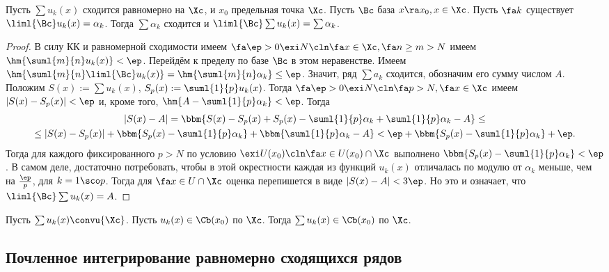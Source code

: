 \documentclass[a4paper]{article}
\begin{document}
\begin{theorem}
Пусть $\sum u_k(x)$ сходится равномерно на $\Xc$, и $x_0$ предельная точка $\Xc$. Пусть $\Bc$ база
$x \ra x_0, x \in \Xc$. Пусть $\fa k$ существует $\liml{\Bc} u_k(x) =\alpha_k$. Тогда $\sum \alpha_k$ сходится и $\liml{\Bc}
\sum u_k(x) = \sum \alpha_k$.
\end{theorem}
\begin{proof}
В силу КК и равномерной сходимости имеем $\fa \ep > 0 \exi N\cln \fa x \in \Xc, \fa n \ge m>N$ имеем $\hm{\suml{m}{n}u_k(x)} < \ep$.
Перейдём к пределу по базе $\Bc$ в этом неравенстве. Имеем $\hm{\suml{m}{n}\liml{\Bc}u_k(x)} = \hm{\suml{m}{n} \alpha_k}
\le \ep$. Значит, ряд $\sum a_k$ сходится, обозначим его сумму числом $A$. Положим $S(x) := \sum u_k(x)$, $S_p(x) := \suml{1}{p} u_k(x)$.
Тогда $\fa \ep > 0 \exi N\cln \fa p > N, \fa x \in \Xc$ имеем $|S(x)-S_p(x)|<\ep$ и, кроме того, $\hm{A-\suml{1}{p}\alpha_k} < \ep$.
Тогда
\begin{multline*}
|S(x)-A| = \bbm{S(x)-S_p(x)+S_p(x)-\suml{1}{p}\alpha_k+\suml{1}{p}\alpha_k-A} \le\\
\le|S(x)-S_p(x)|+\bbm{S_p(x)-\suml{1}{p}\alpha_k} +\bbm{\suml{1}{p}\alpha_k-A} <\ep+\bbm{S_p(x)-\suml{1}{p}\alpha_k} +\ep.
\end{multline*}
Тогда для каждого фиксированного $p>N$ по условию $\exi U(x_0)\cln \fa x \in U(x_0) \cap \Xc$ выполнено
$\bbm{S_p(x)-\suml{1}{p}\alpha_k} < \ep$. В самом деле, достаточно потребовать, чтобы в этой окрестности каждая из функций $u_k(x)$ отличалась
по модулю от $\alpha_k$ меньше, чем на $\frac{\ep}{p}$, для $k=1\sco p$. Тогда для $\fa x \in U \cap \Xc$ оценка перепишется в виде $|S(x)-A| < 3\ep$.
Но это и означает, что $\liml{\Bc} \sum u_k(x) = A$.
\end{proof}

\begin{imp}
Пусть $\sum u_k(x)\convu{\Xc}$. Пусть $u_k(x) \in\Cb(x_0)$ по $\Xc$.
Тогда $\sum u_k(x) \in\Cb(x_0)$ по $\Xc$.
\end{imp}

\subsection{Почленное интегрирование равномерно сходящихся рядов}
\end{document}

